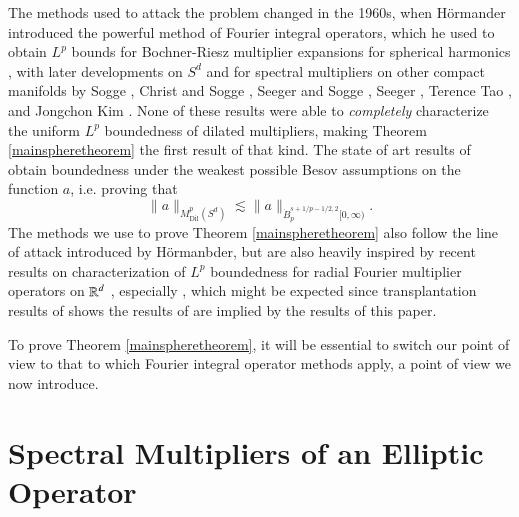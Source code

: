 The methods used to attack the problem changed in the 1960s, when H\"{o}rmander introduced the powerful method of Fourier integral operators, which he used to obtain $L^p$ bounds for Bochner-Riesz multiplier expansions for spherical harmonics \cite{HormanderRiesz}, with later developments on $S^d$ and for spectral multipliers on other compact manifolds by Sogge \cite{SoggeSpectralClusters,SoggeRieszMeans,SoggeSphericalHarmonics}, Christ and Sogge \cite{ChristandSogge}, Seeger and Sogge \cite{SeegerSoggeBochnerRiesz}, Seeger \cite{SeegerEndpointEstimatesMultipliers}, Terence Tao \cite{Tao}, and Jongchon Kim \cite{KimSpectral}. None of these results were able to \emph{completely} characterize the uniform $L^p$ boundedness of dilated multipliers, making Theorem \ref{mainspheretheorem} the first result of that kind. The state of art results of \cite{KimSpectral} obtain boundedness under the weakest possible Besov assumptions on the function $a$, i.e. proving that
%
\begin{equation}
  \| a \|_{M^p_{\text{Dil}}(S^d)} \lesssim \| a \|_{\dot{B}^{s+1/p - 1/2,2}_p[0,\infty)}.
\end{equation}
%
The methods we use to prove Theorem \ref{mainspheretheorem} also follow the line of attack introduced by H\"{o}rmanbder, but are also heavily inspired by recent results on characterization of $L^p$ boundedness for radial Fourier multiplier operators on $\operatorname{\mathbb{R}}^d$ \cite{Cladek,GarrigosandSeeger,HeoandNazarovandSeeger,KimQuasiradial}, especially \cite{HeoandNazarovandSeeger}, which might be expected since transplantation results of \cite{Mitjagin} shows the results of \cite{HeoandNazarovandSeeger} are implied by the results of this paper.

To prove Theorem \ref{mainspheretheorem}, it will be essential to switch our point of view to that to which Fourier integral operator methods apply, a point of view we now introduce.

\section{Spectral Multipliers of an Elliptic Operator}

